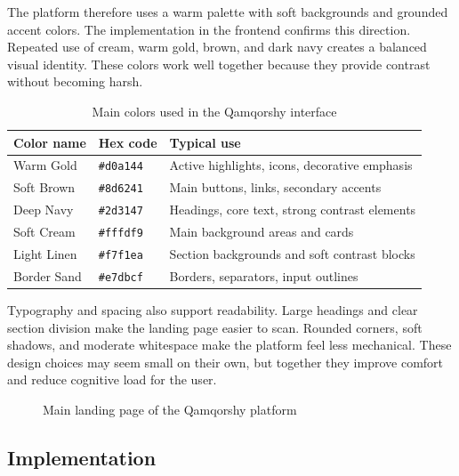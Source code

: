 \documentclass[12pt,a4paper]{article}
\begin{document}
The platform therefore uses a warm palette with soft backgrounds and grounded accent colors. The implementation in the frontend confirms this direction. Repeated use of cream, warm gold, brown, and dark navy creates a balanced visual identity. These colors work well together because they provide contrast without becoming harsh.

\begin{table}[H]
\centering
\caption{Main colors used in the Qamqorshy interface}
\label{tab:colors}
\begin{tabular}{l l l}
\toprule
\textbf{Color name} & \textbf{Hex code} & \textbf{Typical use} \\
\midrule
Warm Gold & \texttt{\#d0a144} & Active highlights, icons, decorative emphasis \\
Soft Brown & \texttt{\#8d6241} & Main buttons, links, secondary accents \\
Deep Navy & \texttt{\#2d3147} & Headings, core text, strong contrast elements \\
Soft Cream & \texttt{\#fffdf9} & Main background areas and cards \\
Light Linen & \texttt{\#f7f1ea} & Section backgrounds and soft contrast blocks \\
Border Sand & \texttt{\#e7dbcf} & Borders, separators, input outlines \\
\bottomrule
\end{tabular}
\end{table}

Typography and spacing also support readability. Large headings and clear section division make the landing page easier to scan. Rounded corners, soft shadows, and moderate whitespace make the platform feel less mechanical. These design choices may seem small on their own, but together they improve comfort and reduce cognitive load for the user.

\begin{figure}[H]
\centering
{}
\caption{Main landing page of the Qamqorshy platform}
\label{fig:landing-screenshot-placeholder}
\end{figure}

\subsection{Implementation}
\end{document}

